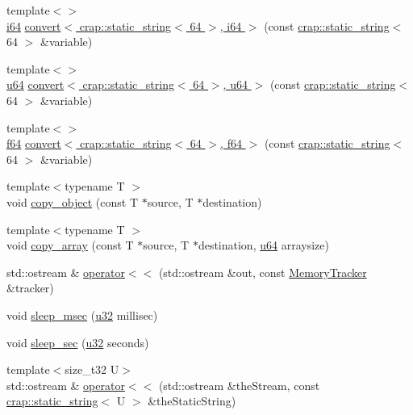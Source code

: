 \begin{DoxyCompactItemize}
\item 
{\footnotesize template$<$$>$ }\\\hyperlink{types_8h_a85cb35fbe5bf2961d7ad5f26814a91a2}{i64} \hyperlink{namespacecrap_a54fcf9af3744e6938f43cfd9e182ef89}{convert$<$ crap\-::static\-\_\-string$<$ 64 $>$, i64 $>$} (const \hyperlink{classcrap_1_1static__string}{crap\-::static\-\_\-string}$<$ 64 $>$ \&variable)
\item 
{\footnotesize template$<$$>$ }\\\hyperlink{types_8h_a3f7e2bcbb0b4c338f3c4f6c937cd4234}{u64} \hyperlink{namespacecrap_a8df61cdb23ea9ccc6af9abba867dd761}{convert$<$ crap\-::static\-\_\-string$<$ 64 $>$, u64 $>$} (const \hyperlink{classcrap_1_1static__string}{crap\-::static\-\_\-string}$<$ 64 $>$ \&variable)
\item 
{\footnotesize template$<$$>$ }\\\hyperlink{types_8h_a76c9f53497f766e57b184bc8a93ab73f}{f64} \hyperlink{namespacecrap_ace7d892387195e73987a6dd52189cbba}{convert$<$ crap\-::static\-\_\-string$<$ 64 $>$, f64 $>$} (const \hyperlink{classcrap_1_1static__string}{crap\-::static\-\_\-string}$<$ 64 $>$ \&variable)
\item 
{\footnotesize template$<$typename T $>$ }\\void \hyperlink{namespacecrap_a3a2a705c808da2a61cfb12b422aac51d}{copy\-\_\-object} (const T $\ast$source, T $\ast$destination)
\item 
{\footnotesize template$<$typename T $>$ }\\void \hyperlink{namespacecrap_a13f2cdb5b88da94facf95bbbd88330ef}{copy\-\_\-array} (const T $\ast$source, T $\ast$destination, \hyperlink{types_8h_a3f7e2bcbb0b4c338f3c4f6c937cd4234}{u64} arraysize)
\item 
std\-::ostream \& \hyperlink{namespacecrap_a6574b219457c4daf68056f63762f3e80}{operator$<$$<$} (std\-::ostream \&out, const \hyperlink{classcrap_1_1_memory_tracker}{Memory\-Tracker} \&tracker)
\item 
void \hyperlink{namespacecrap_a456564ec7eb81a5dfb124da2d1f4473e}{sleep\-\_\-msec} (\hyperlink{types_8h_afaa62991928fb9fb18ff0db62a040aba}{u32} millisec)
\item 
void \hyperlink{namespacecrap_a5f7a95a1ebcb426f62367ed5455b4a85}{sleep\-\_\-sec} (\hyperlink{types_8h_afaa62991928fb9fb18ff0db62a040aba}{u32} seconds)
\item 
{\footnotesize template$<$size\-\_\-t32 U$>$ }\\std\-::ostream \& \hyperlink{namespacecrap_acfd873439817652d6dbf77c90afe5e21}{operator$<$$<$} (std\-::ostream \&the\-Stream, const \hyperlink{classcrap_1_1static__string}{crap\-::static\-\_\-string}$<$ U $>$ \&the\-Static\-String)
\end{DoxyCompactItemize}
